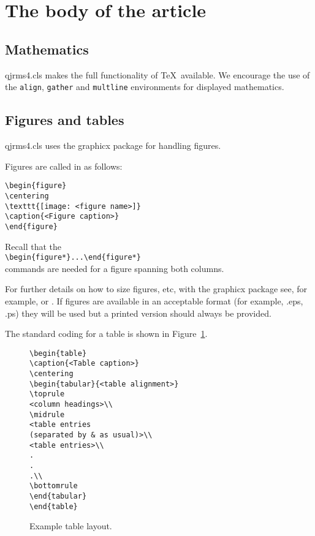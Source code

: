 \documentclass[times]{qjrms4}
\begin{document}
\section{The body of the article}

\subsection{Mathematics} \textsf{qjrms4.cls} makes the full
functionality of \AmS\/\TeX\ available. We encourage the use of
the \verb"align", \verb"gather" and \verb"multline" environments
for displayed mathematics.

\subsection{Figures and tables} \textsf{qjrms4.cls} uses the
\textsf{graphicx} package for handling figures.

Figures are called in as follows:
\begin{verbatim}
\begin{figure}
\centering
\texttt{[image: <figure name>]}
\caption{<Figure caption>}
\end{figure}
\end{verbatim}
Recall that the\\
\verb"\begin{figure*}...\end{figure*}"\\
commands are needed for a
figure spanning both columns.

For further details on how to size figures, etc, with the
\textsf{graphicx} package see, for example, \cite{R1} or
\cite{R3}. If figures are available in an acceptable format (for
example, .eps, .ps) they will be used but a printed version should
always be provided. \medbreak

The standard coding for a table is shown in Figure~\ref{F2}.

\begin{figure}
\begin{verbatim}
\begin{table}
\caption{<Table caption>}
\centering
\begin{tabular}{<table alignment>}
\toprule
<column headings>\\
\midrule
<table entries
(separated by & as usual)>\\
<table entries>\\
.
.
.\\
\bottomrule
\end{tabular}
\end{table}
\end{verbatim}
\caption{Example table layout.\label{F2}}
\end{figure}
\end{document}
